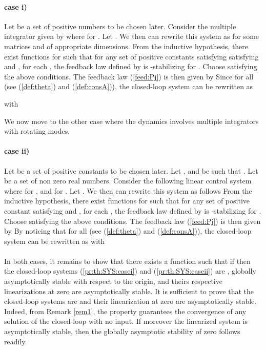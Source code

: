 \documentclass[letterpaper, 10pt]{article}
\newcommand{\rref}[1]{(\ref{#1})}
\begin{document}
\paragraph{case i)} Let  be a set of positive numbers to be chosen later. Consider the multiple integrator given by
 where  for . Let . We then can rewrite this system as 
 for some matrices  and  of appropriate dimensions. From the inductive hypothesis, there exist  functions  for  such that for any set of positive constants  satisfying  satisfying  and   , for each ,
the feedback law  defined by 
 is -stabilizing for . Choose  satisfying the above conditions. The feedback law \rref{feed:Pj} is then given by
 Since  for all (see \rref{def:theta} and \rref{def:consA}), the closed-loop system can be rewritten as

 with

We now move to the other case where the dynamics involves multiple integrators with rotating modes.
\paragraph{case ii)} Let  be a set of positive constants to be chosen later. Let , and  be such that . Let  be a set of non zero real numbers. Consider the following linear control system
 where  for  , and  for .  Let . We then can rewrite this system as follows 
 From the inductive hypothesis, there exist  functions  for   such that for any set of positive constant  satisfying  and   , for each ,
the feedback law  defined by
 is -stabilizing for . Choose  satisfying the above conditions. The feedback law \rref{feed:Pj} is then given by
 By noticing that  for all   (see \rref{def:theta} and \rref{def:consA}), the closed-loop system can be rewritten as
 with 


\paragraph{}
In both cases, it remains to show that there exists a function  such that if  then the closed-loop systems \rref{pr:th:SYS:casei} and \rref{pr:th:SYS:caseii}  are , globally asymptotically stable with respect to the origin, and theirs respective linearizations at zero are asymptotically stable. It is sufficient to prove that the closed-loop systems are  and their linearization at zero are asymptotically stable. Indeed, from Remark \ref{rem1}, the  property guarantees the convergence of any solution of the closed-loop with no input. If moreover the linearized system is asymptotically stable, then the globally asymptotic stability of zero follows readily.
\end{document}
